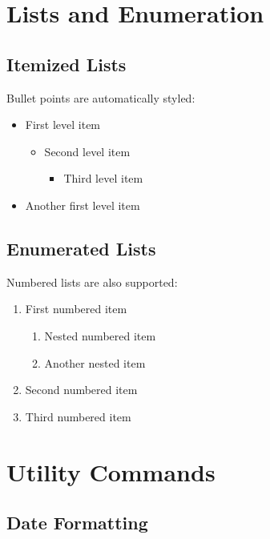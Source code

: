 \documentclass[11pt,letterpaper]{article}
\begin{document}
\section{Lists and Enumeration}

\subsection{Itemized Lists}

Bullet points are automatically styled:

\begin{itemize}
    \item First level item
          \begin{itemize}
              \item Second level item
                    \begin{itemize}
                        \item Third level item
                    \end{itemize}
          \end{itemize}
    \item Another first level item
\end{itemize}

\subsection{Enumerated Lists}

Numbered lists are also supported:

\begin{enumerate}
    \item First numbered item
          \begin{enumerate}
              \item Nested numbered item
              \item Another nested item
          \end{enumerate}
    \item Second numbered item
    \item Third numbered item
\end{enumerate}

\section{Utility Commands}

\subsection{Date Formatting}
\end{document}
